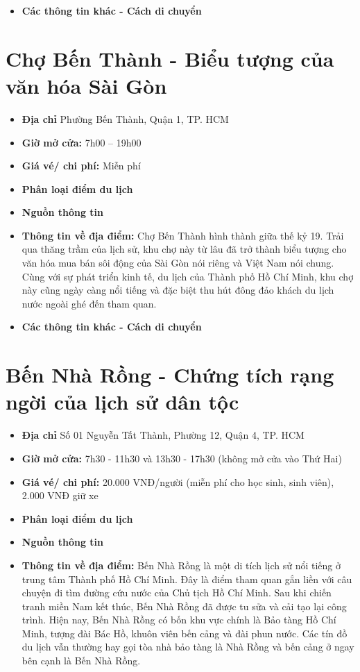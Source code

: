 \documentclass{article}
\begin{document}
\begin{itemize}
    \item{\textbf{Các thông tin khác - Cách di chuyển}}
\end{itemize}

\section{Chợ Bến Thành - Biểu tượng của văn hóa Sài Gòn}
\begin{itemize}
    \item{\textbf{Địa chỉ}} Phường Bến Thành, Quận 1, TP. HCM
    \item{\textbf{Giờ mở cửa:}} 7h00 – 19h00
    \item{\textbf{Giá vé/ chi phí:}} Miễn phí
    \item{\textbf{Phân loại điểm du lịch} }
    \item{\textbf{Nguồn thông tin}}
    \item{\textbf{Thông tin về địa điểm:}} Chợ Bến Thành hình thành giữa thế kỷ 19. Trải qua thăng trầm của lịch sử, khu chợ này từ lâu đã trở thành biểu tượng cho văn hóa mua bán sôi động của Sài Gòn nói riêng và Việt Nam nói chung. Cùng với sự phát triển kinh tế, du lịch của Thành phố Hồ Chí Minh, khu chợ này cũng ngày càng nổi tiếng và đặc biệt thu hút đông đảo khách du lịch nước ngoài ghé đến tham quan.
\end{itemize}

\begin{itemize}
    \item{\textbf{Các thông tin khác - Cách di chuyển}}
\end{itemize}

\section{Bến Nhà Rồng - Chứng tích rạng ngời của lịch sử dân tộc}
\begin{itemize}
    \item{\textbf{Địa chỉ}} Số 01 Nguyễn Tất Thành, Phường 12, Quận 4, TP. HCM
    \item{\textbf{Giờ mở cửa:}} 7h30 - 11h30 và 13h30 - 17h30 (không mở cửa vào Thứ Hai)
    \item{\textbf{Giá vé/ chi phí:}} 20.000 VNĐ/người (miễn phí cho học sinh, sinh viên), 2.000 VNĐ giữ xe
    \item{\textbf{Phân loại điểm du lịch} }
    \item{\textbf{Nguồn thông tin}}
    \item{\textbf{Thông tin về địa điểm:}} Bến Nhà Rồng là một di tích lịch sử nổi tiếng ở trung tâm Thành phố Hồ Chí Minh. Đây là điểm tham quan gắn liền với câu chuyện đi tìm đường cứu nước của Chủ tịch Hồ Chí Minh. Sau khi chiến tranh miền Nam kết thúc, Bến Nhà Rồng đã được tu sửa và cải tạo lại công trình. Hiện nay, Bến Nhà Rồng có bốn khu vực chính là Bảo tàng Hồ Chí Minh, tượng đài Bác Hồ, khuôn viên bến cảng và đài phun nước. Các tín đồ du lịch vẫn thường hay gọi tòa nhà bảo tàng là Nhà Rồng và bến cảng ở ngay bên cạnh là Bến Nhà Rồng.
\end{itemize}
\end{document}
